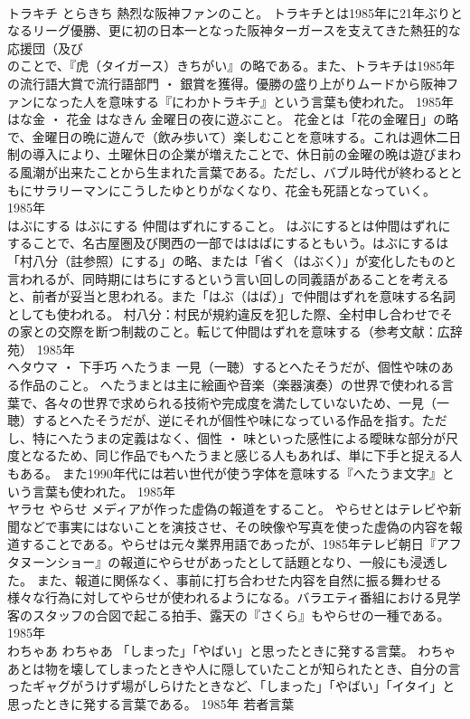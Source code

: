 \documentclass[8pt]{extreport}
\begin{document}
\begin{CJK}{UTF8}{min}
\\	トラキチ	とらきち	熱烈な阪神ファンのこと。	トラキチとは1985年に21年ぶりとなるリーグ優勝、更に初の日本一となった阪神ターガースを支えてきた熱狂的な応援団（及び
\\	のことで、『虎（タイガース）きちがい』の略である。また、トラキチは1985年の流行語大賞で流行語部門 ・ 銀賞を獲得。優勝の盛り上がりムードから阪神ファンになった人を意味する『にわかトラキチ』という言葉も使われた。	1985年	
\\	はな金 ・ 花金	はなきん	金曜日の夜に遊ぶこと。	花金とは「花の金曜日」の略で、金曜日の晩に遊んで（飲み歩いて）楽しむことを意味する。これは週休二日制の導入により、土曜休日の企業が増えたことで、休日前の金曜の晩は遊びまわる風潮が出来たことから生まれた言葉である。ただし、バブル時代が終わるとともにサラリーマンにこうしたゆとりがなくなり、花金も死語となっていく。	1985年	
\\	はぶにする	はぶにする	仲間はずれにすること。	はぶにするとは仲間はずれにすることで、名古屋圏及び関西の一部でははばにするともいう。はぶにするは「村八分（註参照）にする」の略、または「省く（はぶく）」が変化したものと言われるが、同時期にはちにするという言い回しの同義語があることを考えると、前者が妥当と思われる。また「はぶ（はば）」で仲間はずれを意味する名詞としても使われる。 村八分：村民が規約違反を犯した際、全村申し合わせでその家との交際を断つ制裁のこと。転じて仲間はずれを意味する（参考文献：広辞苑）	1985年	
\\	ヘタウマ ・ 下手巧	へたうま	一見（一聴）するとへたそうだが、個性や味のある作品のこと。	へたうまとは主に絵画や音楽（楽器演奏）の世界で使われる言葉で、各々の世界で求められる技術や完成度を満たしていないため、一見（一聴）するとへたそうだが、逆にそれが個性や味になっている作品を指す。ただし、特にへたうまの定義はなく、個性 ・ 味といった感性による曖昧な部分が尺度となるため、同じ作品でもへたうまと感じる人もあれば、単に下手と捉える人もある。 また1990年代には若い世代が使う字体を意味する『へたうま文字』という言葉も使われた。	1985年	
\\	ヤラセ	やらせ	メディアが作った虚偽の報道をすること。	やらせとはテレビや新聞などで事実にはないことを演技させ、その映像や写真を使った虚偽の内容を報道することである。やらせは元々業界用語であったが、1985年テレビ朝日『アフタヌーンショー』の報道にやらせがあったとして話題となり、一般にも浸透した。 また、報道に関係なく、事前に打ち合わせた内容を自然に振る舞わせる様々な行為に対してやらせが使われるようになる。バラエティ番組における見学客のスタッフの合図で起こる拍手、露天の『さくら』もやらせの一種である。	1985年	
\\	わちゃあ	わちゃあ	「しまった」「やばい」と思ったときに発する言葉。	わちゃあとは物を壊してしまったときや人に隠していたことが知られたとき、自分の言ったギャグがうけず場がしらけたときなど、「しまった」「やばい」「イタイ」と思ったときに発する言葉である。	1985年	若者言葉	

\end{CJK}
\end{document}

